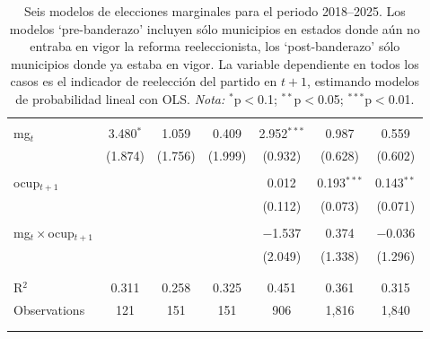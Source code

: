 \documentclass[letter,12pt]{article}
\newcommand{\mc}{\multicolumn}
\begin{document}
\begin{table}
\begin{tabular}{@{\extracolsep{5pt}}lcccccc}
    & & & & & & \\ [-2.5ex]
    mg$_{t}$        &   3.480$^{*}$ &         1.059 &         0.409 &  2.952$^{***}$ &         0.987 &         0.559 \\
    &       (1.874) &       (1.756) &       (1.999) &        (0.932) &       (0.628) &       (0.602) \\
    & & & & & & \\ [-2.5ex]
    ocup$_{t+1}$     &               &               &               &          0.012 & 0.193$^{***}$ &  0.143$^{**}$ \\
    &               &               &               &        (0.112) &       (0.073) &       (0.071) \\
    & & & & & & \\ [-2.5ex]
    mg$_{t}\times$ocup$_{t+1}$ &               &               &               &       $-$1.537 &         0.374 &      $-$0.036 \\
    &               &               &               &        (2.049) &       (1.338) &       (1.296) \\
    & & & & & & \\ [-2.5ex]
    \hline \\[-1.8ex] 
    R$^2$          &         0.311 &         0.258 &         0.325 &          0.451 &         0.361 &         0.315 \\
    Observations   &           121 &           151 &           151 &            906 &         1,816 &         1,840 \\
    & & & & & & \\ [-2.5ex]
    \hline 
    \hline \\[-1.8ex] 
  \end{tabular}
  \caption{Seis modelos de elecciones marginales para el periodo 2018--2025. Los modelos `pre-banderazo' incluyen sólo municipios en estados donde aún no entraba en vigor la reforma reeleccionista, los `post-banderazo' sólo municipios donde ya estaba en vigor. La variable dependiente en todos los casos es el indicador de reelección del partido en $t+1$, estimando modelos de probabilidad lineal con OLS. \textit{Nota:} $^{*}$p$<$0.1; $^{**}$p$<$0.05; $^{***}$p$<$0.01.}\label{T:regs}
\end{table}
\end{document}
